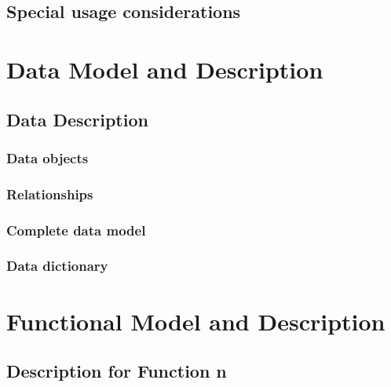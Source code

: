 \documentclass{article}
\begin{document}
\subsection{Special usage considerations}

\section{Data Model and Description}

\subsection{Data Description}

\subsubsection{Data objects}

\subsubsection{Relationships}

\subsubsection{Complete data model}

\subsubsection{Data dictionary}

\section{Functional Model and Description}

\subsection{Description for Function n}
\end{document}

